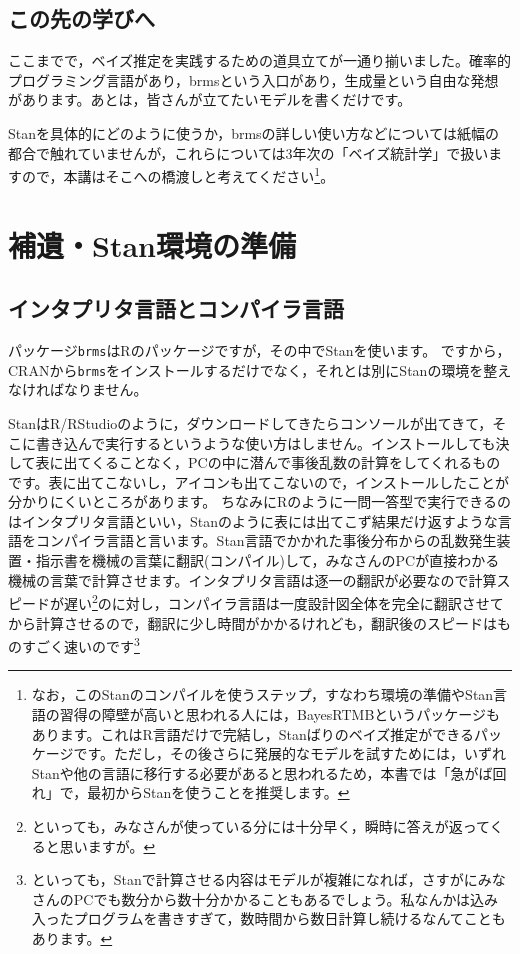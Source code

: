 \documentclass{ltjbook}
\begin{document}
\subsection{この先の学びへ}

ここまでで，ベイズ推定を実践するための道具立てが一通り揃いました。確率的プログラミング言語があり，brmsという入口があり，生成量という自由な発想があります。あとは，皆さんが立てたいモデルを書くだけです。

Stanを具体的にどのように使うか，brmsの詳しい使い方などについては紙幅の都合で触れていませんが，これらについては3年次の「ベイズ統計学」で扱いますので，本講はそこへの橋渡しと考えてください\footnote{なお，このStanのコンパイルを使うステップ，すなわち環境の準備やStan言語の習得の障壁が高いと思われる人には，BayesRTMB\parencite{BayesRTMB}というパッケージもあります。これはR言語だけで完結し，Stanばりのベイズ推定ができるパッケージです。ただし，その後さらに発展的なモデルを試すためには，いずれStanや他の言語に移行する必要があると思われるため，本書では「急がば回れ」で，最初からStanを使うことを推奨します。}。


\section{補遺・Stan環境の準備}
\label{prepare_stan}
\subsection{インタプリタ言語とコンパイラ言語}
パッケージ\verb|brms|はRのパッケージですが，その中でStanを使います。
ですから，CRANから\verb|brms|をインストールするだけでなく，それとは別にStanの環境を整えなければなりません。

StanはR/RStudioのように，ダウンロードしてきたらコンソールが出てきて，そこに書き込んで実行するというような使い方はしません。インストールしても決して表に出てくることなく，PCの中に潜んで事後乱数の計算をしてくれるものです。表に出てこないし，アイコンも出てこないので，インストールしたことが分かりにくいところがあります。
ちなみにRのように一問一答型で実行できるのはインタプリタ言語といい，Stanのように表には出てこず結果だけ返すような言語をコンパイラ言語と言います。Stan言語でかかれた事後分布からの乱数発生装置・指示書を機械の言葉に翻訳(コンパイル)して，みなさんのPCが直接わかる機械の言葉で計算させます。インタプリタ言語は逐一の翻訳が必要なので計算スピードが遅い\footnote{といっても，みなさんが使っている分には十分早く，瞬時に答えが返ってくると思いますが。}のに対し，コンパイラ言語は一度設計図全体を完全に翻訳させてから計算させるので，翻訳に少し時間がかかるけれども，翻訳後のスピードはものすごく速いのです\footnote{といっても，Stanで計算させる内容はモデルが複雑になれば，さすがにみなさんのPCでも数分から数十分かかることもあるでしょう。私なんかは込み入ったプログラムを書きすぎて，数時間から数日計算し続けるなんてこともあります。}
\end{document}
